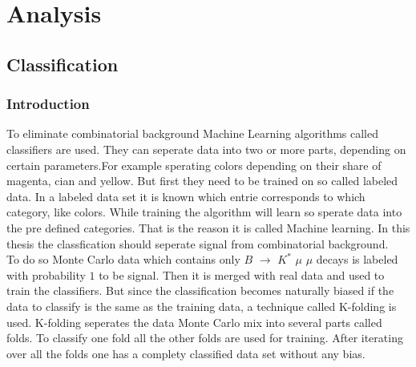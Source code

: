 \documentclass[english]{uzhpub}
\begin{document}
\section{Analysis}

\subsection{Classification}

\subsubsection{Introduction}

To eliminate combinatorial background Machine Learning algorithms called classifiers are used. They can seperate data into two or more parts, depending on certain parameters.For example sperating colors depending on their share of magenta, cian and yellow. But first they need to be trained on so called labeled data. In a labeled data set it is known which entrie corresponds to which category, like colors. While training the algorithm will learn so sperate data into the pre defined categories. That is the reason it is called Machine learning. In this thesis the classfication should seperate signal from combinatorial background. \\
To do so Monte Carlo data which contains only $B$ $\rightarrow$ $K^{*}$ $\mu$ $\mu$ decays is labeled with probability $1$ to be signal. Then it is merged with real data and used to train the classifiers. But since the classification becomes naturally biased if the data to classify is the same as the training data, a technique called K-folding is used. K-folding seperates the data Monte Carlo mix into several parts called folds. To classify one fold all the other folds are used for training. After iterating over all the folds one has a complety classified data set without any bias. \\
\end{document}
